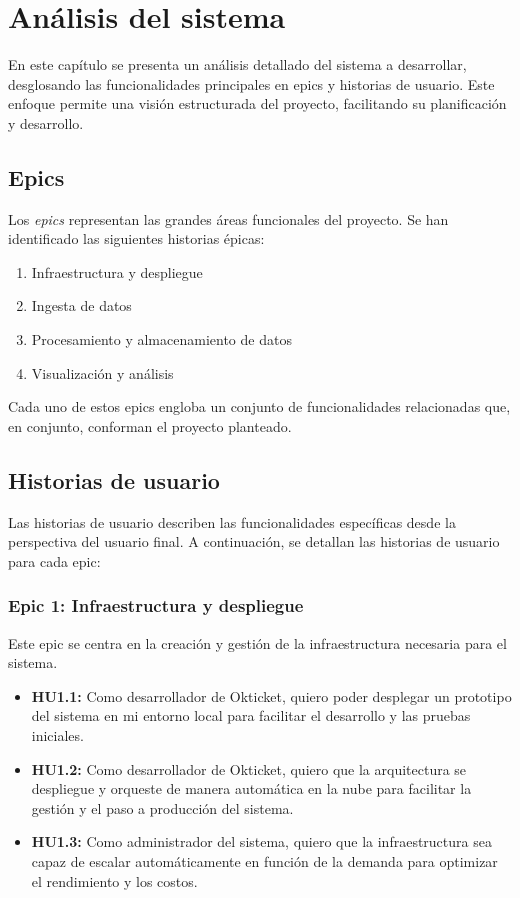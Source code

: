 \chapter{Análisis del sistema}
En este capítulo se presenta un análisis detallado del sistema a desarrollar,
desglosando las funcionalidades principales en epics y historias de usuario.
Este enfoque permite una visión estructurada del proyecto, facilitando su
planificación y desarrollo.

\section{Epics}
Los \textit{epics} representan las grandes áreas funcionales del proyecto.
Se han identificado las siguientes historias épicas:

\begin{enumerate}
    \item Infraestructura y despliegue
    \item Ingesta de datos
    \item Procesamiento y almacenamiento de datos
    \item Visualización y análisis
\end{enumerate}

Cada uno de estos epics engloba un conjunto de funcionalidades relacionadas
que, en conjunto, conforman el proyecto planteado.

\newpage{}
\section{Historias de usuario}
Las historias de usuario describen las funcionalidades específicas desde la
perspectiva del usuario final. A continuación, se detallan las historias de
usuario para cada epic:

\subsection{Epic 1: Infraestructura y despliegue}
Este epic se centra en la creación y gestión de la infraestructura necesaria
para el sistema.

\begin{itemize}
    \item \textbf{HU1.1:} Como desarrollador de Okticket, quiero poder
    desplegar un prototipo del sistema en mi entorno local para facilitar el
    desarrollo y las pruebas iniciales.

    \item \textbf{HU1.2:} Como desarrollador de Okticket, quiero que la
    arquitectura se despliegue y orqueste de manera automática en la nube para
    facilitar la gestión y el paso a producción del sistema.

    \item \textbf{HU1.3:} Como administrador del sistema, quiero que la
    infraestructura sea capaz de escalar automáticamente en función de la
    demanda para optimizar el rendimiento y los costos.
	\end{itemize}

